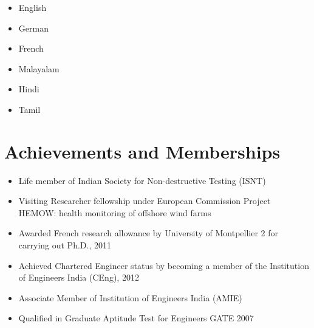 \documentclass{my_cv}%
\begin{document}
\begin{minipage}{0.4\textwidth}
\begin{itemize}
\setlength\itemsep{0.0em}
\item[] English  \hspace{0.5em}  
\item[] German  \hspace{0.2em}  
\item[] French  \hspace{0.8em} 
\end{itemize}
\end{minipage}
\begin{minipage}{0.4\textwidth}
\begin{itemize}
\setlength\itemsep{0.0em}
\item[] Malayalam  \hspace{0.5em}  
\item[] Hindi      \hspace{2.9em}  
\item[] Tamil      \hspace{2.9em} 
\end{itemize}
\end{minipage}
\vspace{2em}
\section{Achievements and Memberships}
\vspace{1em}
\begin{itemize}[leftmargin=0.15in]
\setlength\itemsep{-0.1em}
\color{mygray}
\item Life member of Indian Society for Non-destructive Testing (ISNT)
\item Visiting Researcher fellowship under European Commission Project HEMOW: health monitoring of offshore wind farms
\item Awarded French research allowance by University of Montpellier 2 for carrying out Ph.D., 2011
\item Achieved Chartered Engineer status by becoming a member of the Institution of Engineers India (CEng), 2012
\item Associate Member of Institution of Engineers India (AMIE)
\item Qualified in Graduate Aptitude Test for Engineers GATE 2007
\end{itemize}
\end{document}
